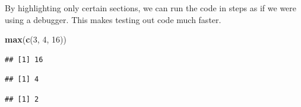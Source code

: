 \documentclass[openany]{book}
\newenvironment{Shaded}{\begin{snugshade}}{\end{snugshade}}
\newcommand{\DecValTok}[1]{\textcolor[rgb]{0.00,0.00,0.81}{#1}}
\newcommand{\KeywordTok}[1]{\textcolor[rgb]{0.13,0.29,0.53}{\textbf{#1}}}
\newcommand{\NormalTok}[1]{#1}
\newcommand{\OperatorTok}[1]{\textcolor[rgb]{0.81,0.36,0.00}{\textbf{#1}}}
\newcommand{\StringTok}[1]{\textcolor[rgb]{0.31,0.60,0.02}{#1}}
\begin{document}
By highlighting only certain sections, we can run the code in steps as if we were
using a debugger. This makes testing out code much faster.

\begin{Shaded}
\begin{Highlighting}[]
\KeywordTok{max}\NormalTok{(}\KeywordTok{c}\NormalTok{(}\DecValTok{3}\NormalTok{, }\DecValTok{4}\NormalTok{, }\DecValTok{16}\NormalTok{))}
\end{Highlighting}
\end{Shaded}

\begin{verbatim}
## [1] 16
\end{verbatim}

\begin{Shaded}
\end{Shaded}

\begin{verbatim}
## [1] 4
\end{verbatim}

\begin{Shaded}
\end{Shaded}

\begin{verbatim}
## [1] 2
\end{verbatim}

\begin{Shaded}
\end{Shaded}
\end{document}
